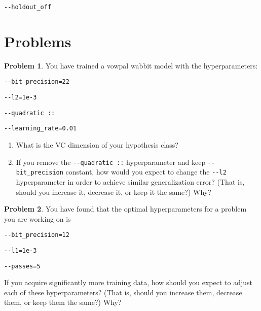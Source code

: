 \documentclass[10pt]{exam}
\theoremstyle{definition}
\newtheorem{problem}{Problem}
\begin{document}
    \vspace{1in}
    \lstinline{--holdout_off}
    \vspace{1in}

\newpage
\section{Problems}

\begin{problem}
    You have trained a vowpal wabbit model with the hyperparameters:
        
        \vspace{0.1in}
        \lstinline{--bit_precision=22}

        \lstinline{--l2=1e-3}

        \lstinline{--quadratic ::}

        \lstinline{--learning_rate=0.01}
        \vspace{0.1in}
    \noindent

    \begin{enumerate}
    \item
        What is the VC dimension of your hypothesis class?

            \vspace{3in}
    \item
        If you remove the \lstinline{--quadratic ::} hyperparameter and keep \lstinline{--bit_precision} constant,
        how would you expect to change the \lstinline{--l2} hyperparameter in order to achieve similar generalization error?
        (That is, should you increase it, decrease it, or keep it the same?)
        Why?
    \end{enumerate}
\end{problem}

\newpage
\begin{problem}
    You have found that the optimal hyperparameters for a problem you are working on is
        
        \vspace{0.1in}
        \lstinline{--bit_precision=12}

        \lstinline{--l1=1e-3}

        \lstinline{--passes=5}
        \vspace{0.1in}

    \noindent
    If you acquire significantly more training data, how should you expect to adjust each of these hyperparameters?
        (That is, should you increase them, decrease them, or keep them the same?)
        Why?
\end{problem}
\end{document}
